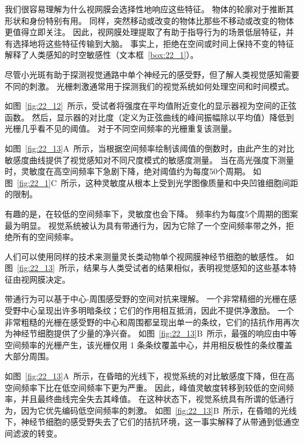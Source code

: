 我们很容易理解为什么视网膜会选择性地响应这些特征。 
物体的轮廓对于推断其形状和身份特别有用。
同样，突然移动或改变的物体比那些不移动或改变的物体更值得立即关注。
因此，视网膜处理提取了有助于指导行为的场景低层特征，并有选择地将这些特征传输到大脑。
事实上，拒绝在空间或时间上保持不变的特征解释了人类感知的时空敏感性（文本框~\ref{box:22_1}）。


\begin{proposition}[人类感知的时空敏感性] \label{box:22_1}
	
	\quad \quad 尽管小光斑有助于探测视觉通路中单个神经元的感受野，但了解人类视觉感知需要不同的刺激。
	光栅刺激通常用于探测我们的视觉系统如何处理空间和时间模式。
	
	\quad \quad 如图~\ref{fig:22_12}~所示，受试者将强度在平均值附近变化的显示器视为空间的正弦函数。
	然后，显示器的对比度（定义为正弦曲线的峰间振幅除以平均值）降低到光栅几乎看不见的阈值。
	对于不同空间频率的光栅重复该测量。
	
	\quad \quad 如图~\ref{fig:22_13}A~所示，当根据空间频率绘制该阈值的倒数时，由此产生的对比敏感度曲线提供了视觉感知对不同尺度模式的敏感度测量。
	当在高光强度下测量时，灵敏度在高空间频率下急剧下降，绝对阈值约为每度50个周期。
	如图~\ref{fig:22_1}C~所示，这种灵敏度从根本上受到光学图像质量和中央凹锥细胞间距的限制。
	
	\quad \quad 有趣的是，在较低的空间频率下，灵敏度也会下降。
	频率约为每度5个周期的图案最为明显。
	视觉系统被认为具有带通行为，因为它除了一个空间频率带之外，拒绝所有的空间频率。
	
	\quad \quad 人们可以使用同样的技术来测量灵长类动物单个视网膜神经节细胞的敏感性。
	如图~\ref{fig:22_13}~所示，结果与人类受试者的结果相似，表明视觉感知的这些基本特征由视网膜决定。
	
	\quad \quad 带通行为可以基于中心-周围感受野的空间对抗来理解。
	一个非常精细的光栅在感受野中心呈现出许多明暗条纹；它们的作用相互抵消，因此不提供净激励。
	一个非常粗糙的光栅在感受野的中心和周围都呈现出单一的条纹，它们的拮抗作用再次为神经节细胞提供了少量的净兴奋。
	如图~\ref{fig:22_13}B~所示，最强的响应由中等空间频率的光栅产生，该光栅仅用 1 条条纹覆盖中心，并用相反极性的条纹覆盖大部分周围。
	
	\quad \quad 如图~\ref{fig:22_13}A~所示，在昏暗的光线下，视觉系统的对比敏感度下降，但在高空间频率下比在低空间频率下更为严重。
	因此，峰值灵敏度转移到较低的空间频率，并且最终曲线完全失去其峰值。
	在这种状态下，视觉系统具有所谓的低通行为，因为它优先编码低空间频率的刺激。
	如图~\ref{fig:22_13}B~所示，在昏暗的光线下，神经节细胞的感受野失去了它们的拮抗环境，这一事实解释了从带通到低通空间滤波的转变。
	

\end{proposition}
